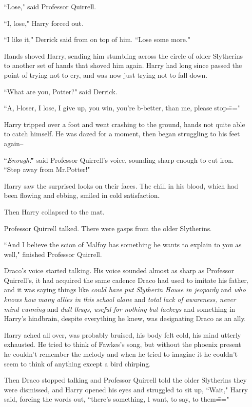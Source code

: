 ``Lose," said Professor Quirrell.

``I, lose," Harry forced out.

``I like it," Derrick said from on top of him. ``Lose some more."

\later

Hands shoved Harry, sending him stumbling across the circle of older Slytherins to another set of hands that shoved him again. Harry had long since passed the point of trying not to cry, and was now just trying not to fall down.

``What are you, Potter?" said Derrick.

``A, l-loser, I lose, I give up, you win, you're b-better, than me, please stop\==="

Harry tripped over a foot and went crashing to the ground, hands not quite able to catch himself. He was dazed for a moment, then began struggling to his feet again\---

``\emph{Enough!}" said Professor Quirrell's voice, sounding sharp enough to cut iron. ``Step away from Mr.\?Potter!"

Harry saw the surprised looks on their faces. The chill in his blood, which had been flowing and ebbing, smiled in cold satisfaction.

Then Harry collapsed to the mat.

Professor Quirrell talked. There were gasps from the older Slytherins.

``And I believe the scion of Malfoy has something he wants to explain to you as well," finished Professor Quirrell.

Draco's voice started talking. His voice sounded almost as sharp as Professor Quirrell's, it had acquired the same cadence Draco had used to imitate his father, and it was saying things like \emph{could have put Slytherin House in jeopardy} and \emph{who knows how many allies in this school alone} and \emph{total lack of awareness, never mind cunning} and \emph{dull thugs, useful for nothing but lackeys} and something in Harry's hindbrain, despite everything he knew, was designating Draco as an ally.

Harry ached all over, was probably bruised, his body felt cold, his mind utterly exhausted. He tried to think of Fawkes's song, but without the phoenix present he couldn't remember the melody and when he tried to imagine it he couldn't seem to think of anything except a bird chirping.

Then Draco stopped talking and Professor Quirrell told the older Slytherins they were dismissed, and Harry opened his eyes and struggled to sit up, ``Wait," Harry said, forcing the words out, ``there's something, I want, to say, to them\==="

